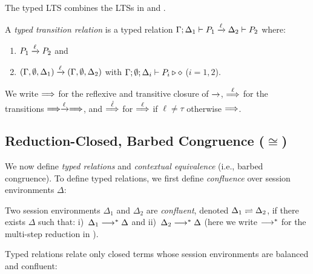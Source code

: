 


\noi
The typed LTS  combines
the LTSs in 
and . 

\begin{definition}
	\label{d:tlts}
	A {\em typed transition relation} is a typed relation
	$\Gamma; \Delta_1 \vdash P_1 \xrightarrow{\ell} \Delta_2 \vdash P_2$
	where:
%
	\begin{enumerate}
		\item
				$P_1 \xrightarrow{\ell} P_2$ and 
		\item
				$(\Gamma, \emptyset, \Delta_1) \xrightarrow{\ell} (\Gamma, \emptyset, \Delta_2)$ 
				with $\Gamma; \emptyset; \Delta_i \vdash P_i \triangleright \diamond$ ($i=1,2$).
	\end{enumerate}
%
	We 
	write  $\stackrel{}{\Longrightarrow}$ for the reflexive and transitive closure of $\xrightarrow{}$,
	$\stackrel{\ell}{\Longrightarrow}$ for the transitions $\stackrel{}{\Longrightarrow}\xrightarrow{\ell}\stackrel{}{\Longrightarrow}$, and $\stackrel{\hat{\ell}}{\Longrightarrow}$
	for $\stackrel{\ell}{\Longrightarrow}$ if $\ell\not = \tau$ otherwise $\stackrel{}{\Longrightarrow}$.
\end{definition}



\subsection{Reduction-Closed, Barbed Congruence ($\cong$)}
\label{subsec:rc}

\noi We now define \emph{typed relations} and \emph{contextual equivalence} (i.e., barbed congruence).  
To define typed relations, we first define \emph{confluence}
over session environments $\Delta$:
%
\begin{definition}\label{d:conf}
	Two session environments $\Delta_1$ and $\Delta_2$
	are \emph{confluent}, denoted $\Delta_1 \rightleftharpoons \Delta_2$,
	if there exists $\Delta$ such that:
	i)~$\Delta_1 \longrightarrow^\ast \Delta$ and 
	ii)~$\Delta_2 \longrightarrow^\ast \Delta$
	(here we write $\longrightarrow^\ast$ for the multi-step reduction in ).
\end{definition}
Typed relations relate only closed terms whose
session environments are balanced  and confluent:

